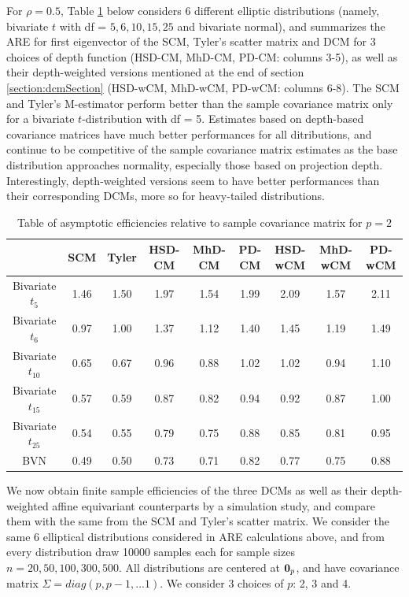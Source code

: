 \documentclass[fleqn,12pt]{article}
\begin{document}
For $\rho=0.5$, Table \ref{table:AREtable} below considers 6 different elliptic distributions (namely, bivariate $t$ with df = $5,6,10,15,25$ and bivariate normal), and summarizes the ARE for first eigenvector of the SCM, Tyler's scatter matrix and DCM for 3 choices of depth function (HSD-CM, MhD-CM, PD-CM: columns 3-5), as well as their depth-weighted versions mentioned at the end of section \ref{section:dcmSection} (HSD-wCM, MhD-wCM, PD-wCM: columns 6-8). The SCM and Tyler's M-estimator perform better than the sample covariance matrix only for a bivariate $t$-distribution with df = 5. Estimates based on depth-based covariance matrices have much better performances for all ditributions, and continue to be competitive of the sample covariance matrix estimates as the base distribution approaches normality, especially those based on projection depth. Interestingly, depth-weighted versions seem to have better performances than their corresponding DCMs, more so for heavy-tailed distributions.

\begin{table}
\begin{footnotesize}
    \begin{tabular}{c|cc|ccc|ccc}
     \hline
                       & SCM  & Tyler & HSD-CM & MhD-CM & PD-CM & HSD-wCM & MhD-wCM & PD-wCM \\ \hline
    Bivariate $t_5$    & 1.46 & 1.50  & 1.97   & 1.54   & 1.99  & 2.09    & 1.57    & 2.11   \\
    Bivariate $t_6$    & 0.97 & 1.00  & 1.37   & 1.12   & 1.40  & 1.45    & 1.19    & 1.49   \\
    Bivariate $t_{10}$ & 0.65 & 0.67  & 0.96   & 0.88   & 1.02  & 1.02    & 0.94    & 1.10   \\
    Bivariate $t_{15}$ & 0.57 & 0.59  & 0.87   & 0.82   & 0.94  & 0.92    & 0.87    & 1.00   \\
    Bivariate $t_{25}$ & 0.54 & 0.55  & 0.79   & 0.75   & 0.88  & 0.85    & 0.81    & 0.95   \\
    BVN   & 0.49 & 0.50  & 0.73   & 0.71   & 0.82  & 0.77    & 0.75    & 0.88   \\ \hline
    \end{tabular}
\end{footnotesize}
\caption{Table of asymptotic efficiencies relative to sample covariance matrix for $p=2$}
\label{table:AREtable}
\end{table}

We now obtain finite sample efficiencies of the three DCMs as well as their depth-weighted affine equivariant counterparts by a simulation study, and compare them with the same from the SCM and Tyler's scatter matrix. We consider the same 6 elliptical distributions considered in ARE calculations above, and from every distribution draw 10000 samples each for sample sizes $n = 20, 50, 100, 300, 500$. All distributions are centered at ${\bf 0}_p$, and have covariance matrix $\Sigma = diag(p,p-1,...1)$. We consider 3 choices of $p$: 2, 3 and 4.
\end{document}
